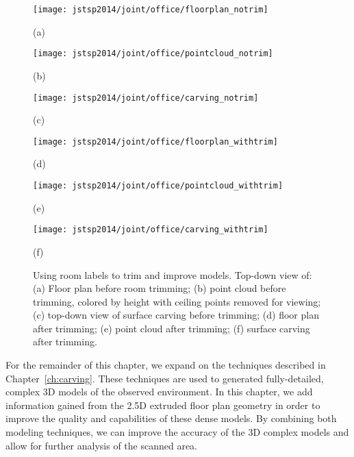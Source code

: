 \documentclass[12pt,onecolumn,oneside]{book}
\begin{document}
\begin{figure}[t]

	\centering

	\begin{minipage}[t]{0.3\linewidth} %
		\centerline{\texttt{[image: jstsp2014/joint/office/floorplan\_notrim]}}
		\centerline{(a)}\medskip
	\end{minipage}
	\hfill
	\begin{minipage}[t]{0.3\linewidth} %
		\centerline{\texttt{[image: jstsp2014/joint/office/pointcloud\_notrim]}}
		\centerline{(b)}\medskip
	\end{minipage}
	\hfill
	\begin{minipage}[t]{0.3\linewidth} %
		\centerline{\texttt{[image: jstsp2014/joint/office/carving\_notrim]}}
		\centerline{(c)}\medskip
	\end{minipage}

	\begin{minipage}[t]{0.3\linewidth} %
		\centerline{\texttt{[image: jstsp2014/joint/office/floorplan\_withtrim]}}
		\centerline{(d)}\medskip
	\end{minipage}
	\hfill
	\begin{minipage}[t]{0.3\linewidth} %
		\centerline{\texttt{[image: jstsp2014/joint/office/pointcloud\_withtrim]}}
		\centerline{(e)}\medskip
	\end{minipage}
	\hfill
	\begin{minipage}[t]{0.3\linewidth} %
		\centerline{\texttt{[image: jstsp2014/joint/office/carving\_withtrim]}}
		\centerline{(f)}\medskip
	\end{minipage}
	
	\caption[Using room labels to trim and improve models.]{Using room labels to trim and improve models.  Top-down view of: (a) Floor plan before room trimming; (b) point cloud before trimming, colored by height with ceiling points removed for viewing; (c) top-down view of surface carving before trimming; (d) floor plan after trimming; (e) point cloud after trimming; (f) surface carving after trimming.}
	\label{fig:explosion_trimming}

\end{figure}

For the remainder of this chapter, we expand on the techniques described in Chapter~\ref{ch:carving}.  These techniques are used to generated fully-detailed, complex 3D models of the observed environment.  In this chapter, we add information gained from the 2.5D extruded floor plan geometry in order to improve the quality and capabilities of these dense models.  By combining both modeling techniques, we can improve the accuracy of the 3D complex models and allow for further analysis of the scanned area.
\end{document}
